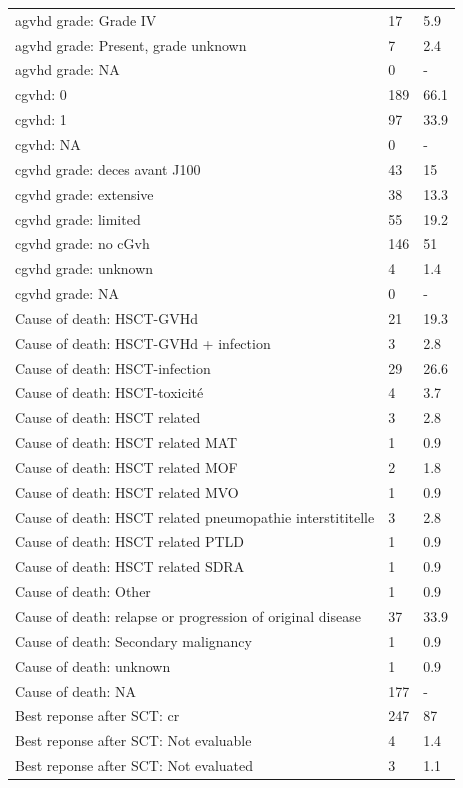 \documentclass[a4paper,11pt] {article}
\begin{document}
\begin{longtable}{lll}
  agvhd grade: Grade IV & 17 & 5.9 \\ 
  agvhd grade: Present, grade unknown & 7 & 2.4 \\ 
  agvhd grade: NA & 0 & - \\ 
  cgvhd: 0 & 189 & 66.1 \\ 
  cgvhd: 1 & 97 & 33.9 \\ 
  cgvhd: NA & 0 & - \\ 
  cgvhd grade: deces avant J100 & 43 & 15 \\ 
  cgvhd grade: extensive & 38 & 13.3 \\ 
  cgvhd grade: limited & 55 & 19.2 \\ 
  cgvhd grade: no cGvh & 146 & 51 \\ 
  cgvhd grade: unknown & 4 & 1.4 \\ 
  cgvhd grade: NA & 0 & - \\ 
  Cause of death: HSCT-GVHd & 21 & 19.3 \\ 
  Cause of death: HSCT-GVHd + infection & 3 & 2.8 \\ 
  Cause of death: HSCT-infection & 29 & 26.6 \\ 
  Cause of death: HSCT-toxicité & 4 & 3.7 \\ 
  Cause of death: HSCT related & 3 & 2.8 \\ 
  Cause of death: HSCT related MAT & 1 & 0.9 \\ 
  Cause of death: HSCT related MOF & 2 & 1.8 \\ 
  Cause of death: HSCT related MVO & 1 & 0.9 \\ 
  Cause of death: HSCT related pneumopathie interstititelle & 3 & 2.8 \\ 
  Cause of death: HSCT related PTLD & 1 & 0.9 \\ 
  Cause of death: HSCT related SDRA & 1 & 0.9 \\ 
  Cause of death: Other & 1 & 0.9 \\ 
  Cause of death: relapse or progression of original disease & 37 & 33.9 \\ 
  Cause of death: Secondary malignancy & 1 & 0.9 \\ 
  Cause of death: unknown & 1 & 0.9 \\ 
  Cause of death: NA & 177 & - \\ 
  Best reponse after SCT: cr & 247 & 87 \\ 
  Best reponse after SCT: Not evaluable & 4 & 1.4 \\ 
  Best reponse after SCT: Not evaluated & 3 & 1.1 \\ 

\end{longtable}
\end{document}
